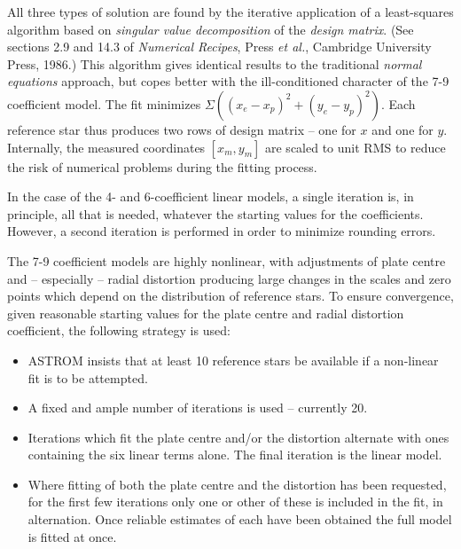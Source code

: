 \documentclass[twoside,11pt]{article}
\renewcommand{\_}{\texttt{\symbol{95}}}
\begin{document}
All three types of solution are found by the iterative application
of a least-squares algorithm based on \textit{singular value
decomposition} of the \textit{design matrix}.  (See sections 2.9 and
14.3 of \textit{Numerical Recipes}, Press \textit{et al.}, Cambridge
University Press, 1986.)  This algorithm gives identical results to
the traditional \textit{normal equations} approach, but copes better
with the ill-conditioned character of the 7-9 coefficient model.
The fit minimizes $\Sigma ((x_{e}-x_{p})^{2}+(y_{e}-y_{p})^{2})$.
Each reference star thus produces two rows of design matrix -- one for $x$
and one for $y$.  Internally, the measured coordinates $[x_{m},y_{m}]$
are scaled to unit RMS to reduce the risk of numerical problems during
the fitting process.

In the case of the 4- and 6-coefficient linear models, a single iteration
is, in principle, all that is needed, whatever the starting values for
the coefficients.  However, a second iteration is performed in order to
minimize rounding errors.

The 7-9 coefficient models are highly nonlinear, with adjustments of
plate centre and -- especially -- radial distortion producing large
changes in the scales and zero points which depend on the distribution
of reference stars.  To ensure convergence, given reasonable starting
values for the plate centre and radial distortion coefficient, the
following strategy is used:

\begin{itemize}

\item ASTROM insists that at least 10 reference stars be available
   if a non-linear fit is to be attempted.

\item A fixed and ample number of iterations is used -- currently 20.

\item Iterations which fit the plate centre and/or the distortion
   alternate with ones containing the six linear terms alone.  The final
   iteration is the linear model.

\item Where fitting of both the plate centre and the distortion has been
   requested, for the first few iterations only one or other of these
   is included in the fit, in alternation.  Once reliable estimates of
   each have been obtained the full model is fitted at once.

\end{itemize}
\end{document}
